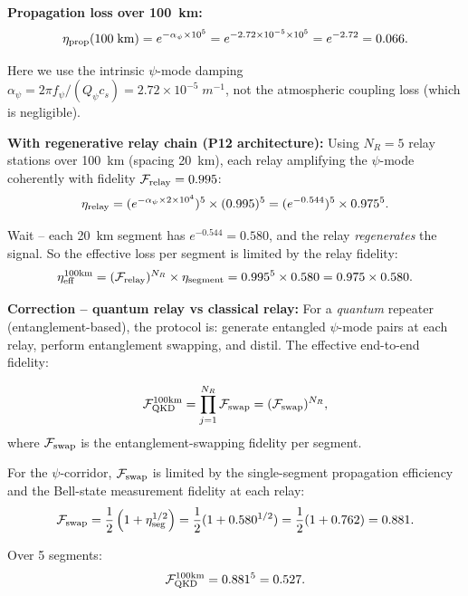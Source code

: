 \documentclass[aps,prd,twocolumn,superscriptaddress,nofootinbib]{revtex4-2}
\newcommand{\Qpsi}{Q_\psi}
\begin{document}
\textbf{Propagation loss over 100~km:}
\begin{equation}
\eta_{\rm prop}(100\;\text{km}) = e^{-\alpha_\psi\times10^5}
= e^{-2.72\times10^{-5}\times10^5} = e^{-2.72} = 0.066.
\end{equation}

Here we use the intrinsic $\psi$-mode damping
$\alpha_\psi = 2\pi f_\psi/(\Qpsi c_s) = 2.72\times10^{-5}\;\si{m^{-1}}$,
not the atmospheric coupling loss (which is negligible).

\textbf{With regenerative relay chain (P12 architecture):}
Using $N_R = 5$ relay stations over 100~km (spacing 20~km),
each relay amplifying the $\psi$-mode coherently with fidelity
$\mathcal{F}_{\rm relay} = 0.995$:
\begin{equation}
\eta_{\rm relay} = (e^{-\alpha_\psi\times2\times10^4})^5
\times(0.995)^5 = (e^{-0.544})^5\times0.975^5.
\end{equation}

Wait -- each 20~km segment has $e^{-0.544} = 0.580$, and the relay
\emph{regenerates} the signal. So the effective loss per segment
is limited by the relay fidelity:
\begin{equation}
\eta_{\rm eff}^{\rm 100km} = (\mathcal{F}_{\rm relay})^{N_R}
\times\eta_{\rm segment} = 0.995^5\times0.580 = 0.975\times0.580.
\end{equation}

\textbf{Correction -- quantum relay vs classical relay:}
For a \emph{quantum} repeater (entanglement-based), the protocol
is: generate entangled $\psi$-mode pairs at each relay, perform
entanglement swapping, and distil. The effective end-to-end fidelity:

\begin{equation}
\mathcal{F}_{\rm QKD}^{\rm 100km}
= \prod_{j=1}^{N_R}\mathcal{F}_{\rm swap}
= (\mathcal{F}_{\rm swap})^{N_R},
\label{eq:qkd_fidelity}
\end{equation}
where $\mathcal{F}_{\rm swap}$ is the entanglement-swapping fidelity
per segment.

For the $\psi$-corridor, $\mathcal{F}_{\rm swap}$ is limited by the
single-segment propagation efficiency and the Bell-state measurement
fidelity at each relay:
\begin{equation}
\mathcal{F}_{\rm swap} = \frac{1}{2}\left(1 + \eta_{\rm seg}^{1/2}\right)
= \frac{1}{2}(1 + 0.580^{1/2}) = \frac{1}{2}(1 + 0.762) = 0.881.
\end{equation}

Over 5 segments:
\begin{equation}
\mathcal{F}_{\rm QKD}^{\rm 100km} = 0.881^5 = 0.527.
\end{equation}
\end{document}

